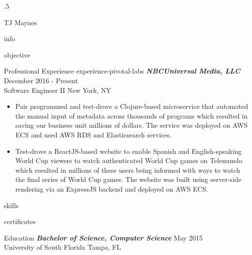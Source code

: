 \documentclass[10pt]{article}
\begin{document}
\moveleft.5\hoffset\centerline{\huge TJ Maynes}
{info}

{objective}

\begin{section}{Professional Experience}
  {experience-pivotal-labs}
  {\sl \textbf{NBCUniversal Media, LLC}} \hfill December 2016 - Present \\ Software Engineer II \hfill New York, NY
  \begin{itemize}
  \item Pair programmed and test-drove a Clojure-based microservice that automated the manual input of metadata across thousands of programs which resulted in saving our business unit millions of dollars. The service was deployed on AWS ECS and used AWS RDS and Elasticsearch services.
  \item Test-drove a ReactJS-based website to enable Spanish and English-speaking World Cup viewers to watch authenticated World Cup games on Telemundo which resulted in millions of these users being informed with ways to watch the final series of World Cup games. The website was built using server-side rendering via an ExpressJS backend and deployed on AWS ECS.
  \end{itemize}
\end{section}

{skills}

{certificates}

\begin{section}{Education}
  {\sl \textbf{Bachelor of Science, Computer Science}} \hfill May 2015  \\
  University of South Florida \hfill Tampa, FL
\end{section}
\end{document}
